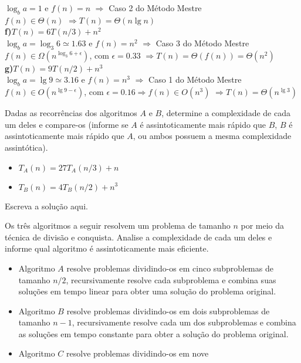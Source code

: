 \documentclass[a4paper]{exam}
\begin{document}
\begin{questions}
\begin{solution}
      $\log_b a = 1 $ e $f(n) = n$ $\Rightarrow$  Caso 2 do Método Mestre\\
      $f(n) \in \Theta(n)$
      $\Rightarrow T(n) = \Theta(n\lg n)$\\
    \textbf{f)$T(n) = 6T(n/3) + n^2$}\\
      $\log_b a = \log_3 6 \simeq 1.63$ e $f(n) = n^2$ $\Rightarrow$  Caso 3 do Método Mestre\\
      $f(n) \in \Omega(n^{\log_3 6 + \epsilon})$, com $\epsilon = 0.33$
      $\Rightarrow T(n) = \Theta(f(n)) = \Theta(n^2)$\\
    \textbf{g)$T(n) = 9T(n/2) + n^3$}\\
      $\log_b a = \lg 9 \simeq 3.16$ e $f(n) = n^3$ $\Rightarrow$  Caso 1 do Método Mestre\\
      $f(n) \in O(n^{\lg 9 - \epsilon})$, com $\epsilon = 0.16 \Rightarrow f(n) \in O(n^3)$
      $\Rightarrow T(n) = \Theta(n^{\lg 3})$
  \end{solution}
  \question Dadas as recorrências dos algoritmos $A$ e
  $B$, determine a complexidade de cada um deles e compare-os
  (informe se $A$ é assintoticamente mais rápido que $B$, $B$
  é assintoticamente mais rápido que $A$, ou ambos possuem a
  mesma complexidade assintótica).
  \begin{itemize}
  \item $T_A(n) = 27T_A(n/3) + n$
  \item $T_B(n) = 4T_B(n/2) + n^3$
  \end{itemize}
  \begin{solution}
    Escreva a solução aqui.
  \end{solution}
  \question Os três algoritmos a seguir resolvem um
  problema de tamanho $n$ por meio da técnica de divisão e conquista.
  Analise a complexidade de cada um deles e informe qual algoritmo é
  assintoticamente mais eficiente.
  \begin{itemize}
  \item Algoritmo $A$ resolve problemas dividindo-os em cinco
    subproblemas de tamanho $n/2$, recursivamente resolve cada
    subproblema e combina suas soluções em tempo linear para obter
    uma solução do problema original.
    \item Algoritmo $B$ resolve problemas dividindo-os em dois
      subproblemas de tamanho $n-1$, recursivamente resolve cada um
      dos subproblemas e combina as soluções em tempo constante para
      obter a solução do problema original.
    \item Algoritmo $C$ resolve problemas dividindo-os em nove 

\end{itemize}
\end{questions}
\end{document}
